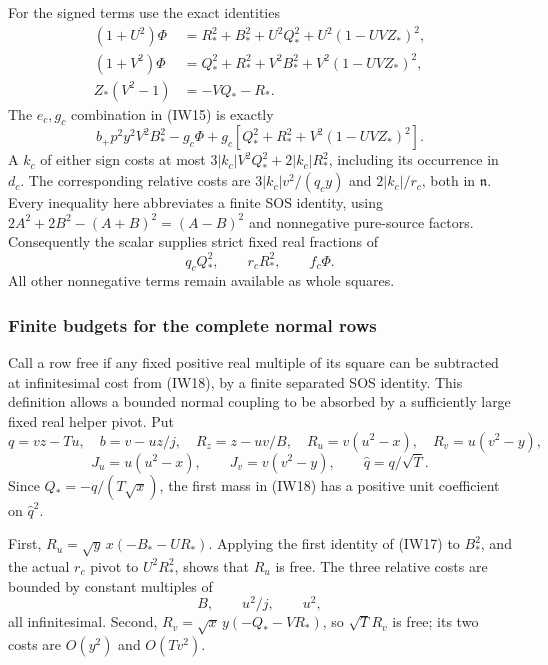 For the signed terms use the exact identities
\[
\begin{split}
 (1+U^2)\Phi&=R_*^2+B_*^2+U^2Q_*^2+U^2(1-UVZ_*)^2,\\
 (1+V^2)\Phi&=Q_*^2+R_*^2+V^2B_*^2+V^2(1-UVZ_*)^2,\\
 Z_*(V^2-1)&=-VQ_*-R_*.
\end{split}                                                     \tag{IW17}
\]
The $e_c,g_c$ combination in (IW15) is exactly
\[
 b_+p^2y^2V^2B_*^2-g_c\Phi
       +g_c[Q_*^2+R_*^2+V^2(1-UVZ_*)^2].
\]
A $k_c$ of either sign costs at most
$3|k_c|V^2Q_*^2+2|k_c|R_*^2$, including its occurrence in $d_c$.
The corresponding relative costs are
$3|k_c|v^2/(q_cy)$ and $2|k_c|/r_c$, both in $\mathfrak n$.
Every inequality here abbreviates a finite SOS identity, using
$2A^2+2B^2-(A+B)^2=(A-B)^2$ and nonnegative pure-source factors.
Consequently the scalar supplies strict fixed real fractions of
\[
                       q_cQ_*^2,\qquad r_cR_*^2,
                       \qquad f_c\Phi.                \tag{IW18}
\]
All other nonnegative terms remain available as whole squares.

\subsubsection*{Finite budgets for the complete normal rows}

Call a row free if any fixed positive real multiple of its square can
be subtracted at infinitesimal cost from (IW18), by a finite separated
SOS identity. This definition allows a bounded normal coupling to be
absorbed by a sufficiently large fixed real helper pivot.
Put
\[
 q=vz-Tu,\quad b=v-uz/j,\quad R_z=z-uv/B,\quad
 R_u=v(u^2-x),\quad R_v=u(v^2-y),
\]
\[
 J_u=u(u^2-x),\qquad J_v=v(v^2-y),\qquad
 \widehat q=q/\sqrt T.
\]
Since $Q_*=-q/(T\sqrt x)$, the first mass in (IW18) has a positive
unit coefficient on $\widehat q^2$.

First, $R_u=\sqrt y\,x(-B_*-UR_*)$. Applying the first identity
of (IW17) to $B_*^2$, and the actual $r_c$ pivot to $U^2R_*^2$,
shows that $R_u$ is free. The three relative costs are bounded by
constant multiples of
\[
                         B,\qquad u^2/j,\qquad u^2,
                                                               \tag{IW19}
\]
all infinitesimal. Second,
$R_v=\sqrt x\,y(-Q_*-VR_*)$, so $\sqrt T R_v$ is free;
its two costs are $O(y^2)$ and $O(Tv^2)$.

